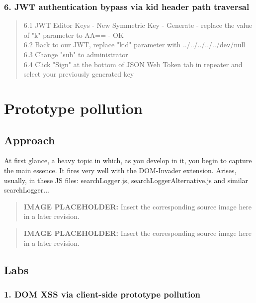 \documentclass[
  letterpaper,
]{article}
\begin{document}
\subsubsection{6. JWT authentication bypass via kid header path
traversal}\label{6-jwt-authentication-bypass-via-kid-header-path-traversal}

\begin{quote}
6.1 JWT Editor Keys - New Symmetric Key - Generate - replace the value
of "k" parameter to AA== - OK\\
6.2 Back to our JWT, replace "kid" parameter with
../../../../../dev/null\\
6.3 Change "sub" to administrator\\
6.4 Click "Sign" at the bottom of JSON Web Token tab in repeater and
select your previously generated key
\end{quote}

\section{Prototype pollution}\label{prototype-pollution}

\subsection{Approach}\label{approach-21}

At first glance, a heavy topic in which, as you develop in it, you begin
to capture the main essence. It fires very well with the DOM-Invader
extension. Arises, usually, in these JS files: searchLogger.js,
searchLoggerAlternative.js and similar searchLogger...\\
\begin{quote}
\textbf{IMAGE PLACEHOLDER:} Insert the corresponding source image here in a later revision.
\end{quote}
\begin{quote}
\textbf{IMAGE PLACEHOLDER:} Insert the corresponding source image here in a later revision.
\end{quote}
\subsection{Labs}\label{labs-20}

\subsubsection{1. DOM XSS via client-side prototype
pollution}\label{1-dom-xss-via-client-side-prototype-pollution}
\end{document}
